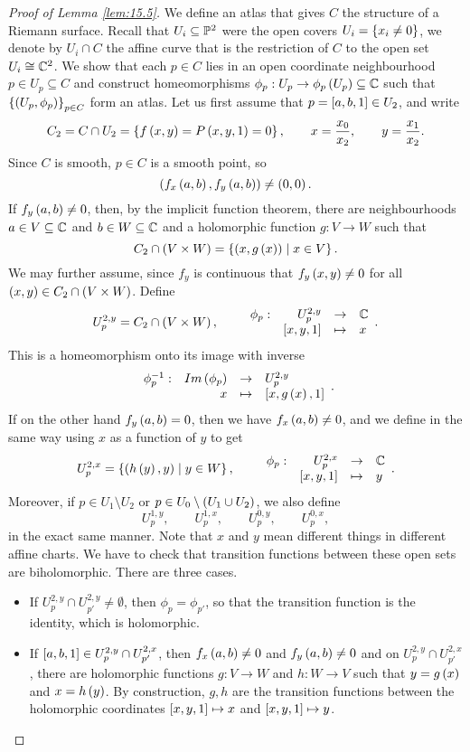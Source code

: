 \begin{proof}[Proof of Lemma \ref{lem:15.5}]
We define an atlas that gives $ C $ the structure of a Riemann surface. Recall that $ U_i \subseteq \P^2 $ were the open covers $ U_i = \cb{x_i \ne 0} $, we denote by $ U_i \cap C $ the affine curve that is the restriction of $ C $ to the open set $ U_i \cong \C^2 $. We show that each $ p \in C $ lies in an open coordinate neighbourhood $ p \in U_p \subseteq C $ and construct homeomorphisms $ \phi_p : U_p \to \phi_p\rb{U_p} \subseteq \C $ such that $ \cb{\rb{U_p, \phi_p}}_{p \in C} $ form an atlas. Let us first assume that $ p = \sb{a, b, 1} \in U_2 $, and write
$$ C_2 = C \cap U_2 = \cb{f\rb{x, y} = P\rb{x, y, 1} = 0}, \qquad x = \dfrac{x_0}{x_2}, \qquad y = \dfrac{x_1}{x_2}. $$
Since $ C $ is smooth, $ p \in C $ is a smooth point, so
$$ \rb{f_x\rb{a, b}, f_y\rb{a, b}} \ne \rb{0, 0}. $$
If $ f_y\rb{a, b} \ne 0 $, then, by the implicit function theorem, there are neighbourhoods $ a \in V \subseteq \C $ and $ b \in W \subseteq \C $ and a holomorphic function $ g : V \to W $ such that
$$ C_2 \cap \rb{V \times W} = \cb{\rb{x, g\rb{x}} \mid x \in V}. $$
We may further assume, since $ f_y $ is continuous that $ f_y\rb{x, y} \ne 0 $ for all $ \rb{x, y} \in C_2 \cap \rb{V \times W} $. Define
$$ U_p^{2, y} = C_2 \cap \rb{V \times W}, \qquad \function[\phi_p]{U_p^{2, y}}{\C}{\sb{x, y, 1}}{x}. $$
This is a homeomorphism onto its image with inverse
$$ \function[\phi_p^{-1}]{Im\rb{\phi_p}}{U_p^{2, y}}{x}{\sb{x, g\rb{x}, 1}}. $$
If on the other hand $ f_y\rb{a, b} = 0 $, then we have $ f_x\rb{a, b} \ne 0 $, and we define in the same way using $ x $ as a function of $ y $ to get
$$ U_p^{2, x} = \cb{\rb{h\rb{y}, y} \mid y \in W}, \qquad \function[\phi_p]{U_p^{2, x}}{\C}{\sb{x, y, 1}}{y}. $$
Moreover, if $ p \in U_1 \setminus U_2 $ or $ p \in U_0 \setminus \rb{U_1 \cup U_2} $, we also define
$$ U_p^{1, y}, \qquad U_p^{1, x}, \qquad U_p^{0, y}, \qquad U_p^{0, x}, $$
in the exact same manner. Note that $ x $ and $ y $ mean different things in different affine charts. We have to check that transition functions between these open sets are biholomorphic. There are three cases.
\begin{itemize}
\item If $ U_p^{2, y} \cap U_{p'}^{2, y} \ne \emptyset $, then $ \phi_p = \phi_{p'} $, so that the transition function is the identity, which is holomorphic.
\item If $ \sb{a, b, 1} \in U_p^{2, y} \cap U_{p'}^{2, x} $, then $ f_x\rb{a, b} \ne 0 $ and $ f_y\rb{a, b} \ne 0 $ and on $ U_p^{2, y} \cap U_{p'}^{2, x} $, there are holomorphic functions $ g : V \to W $ and $ h : W \to V $ such that $ y = g\rb{x} $ and $ x = h\rb{y} $. By construction, $ g, h $ are the transition functions between the holomorphic coordinates $ \sb{x, y, 1} \mapsto x $ and $ \sb{x, y, 1} \mapsto y $.

\end{itemize}
\end{proof}
